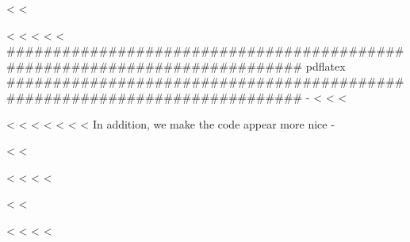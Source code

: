 \setmonofont[ItalicFont=NewCMMono10-Italic.otf,%
BoldFont=NewCMMono10-Bold.otf,%
BoldItalicFont=NewCMMono10-BoldOblique.otf,%
SmallCapsFeatures={Numbers=OldStyle}]{NewCMMono10-Regular.otf}

<%
<%

\usepackage{selnolig}
<%
<%
<%
\else
<%
<%
###########################################################################
pdflatex
###########################################################################
-%
<%
<%
<%
\usepackage[scaled=.95]{helvet}
<%
<%
<%
\RequirePackage{newtxtext}
\RequirePackage{newtxmath}
\RequirePackage[zerostyle=b,scaled=.9]{newtxtt}
<%
<%
<%
<%
In addition, we make the code appear more nice -%

\usepackage[zerostyle=b,scaled=.75]{newtxtt}
<%
<%
\usepackage{XCharter}
\usepackage[scaled=.95]{helvet}
<%
<%
<%
<%
\usepackage[%
    rm={oldstyle=false,proportional=true},%
    sf={oldstyle=false,proportional=true},%
    tt={oldstyle=false,proportional=true,variable=false},%
    qt=false%
]{cfr-lm}
<%
<%

\usepackage[T1]{fontenc}
<%
\fi
<%
<%
<%

